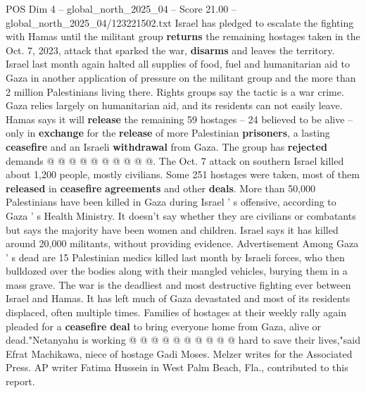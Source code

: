 \begin{textsample}{POS Dim 4 – global\_north\_2025\_04 – Score 21.00 – global\_north\_2025\_04/123221502.txt}
Israel has pledged to escalate the fighting with Hamas until the militant group \textbf{returns} the remaining hostages taken in the Oct. 7, 2023, attack that sparked the war, \textbf{disarms} and leaves the territory.
Israel last month again halted all supplies of food, fuel and humanitarian aid to Gaza in another application of pressure on the militant group and the more than 2 million Palestinians living there.
Rights groups say the tactic is a war crime.
Gaza relies largely on humanitarian aid, and its residents can not easily leave.
Hamas says it will \textbf{release} the remaining 59 hostages -- 24 believed to be alive -- only in \textbf{exchange} for the \textbf{release} of more Palestinian \textbf{prisoners}, a lasting \textbf{ceasefire} and an Israeli \textbf{withdrawal} from Gaza.
The group has \textbf{rejected} demands @ @ @ @ @ @ @ @ @ @.
The Oct. 7 attack on southern Israel killed about 1,200 people, mostly civilians.
Some 251 hostages were taken, most of them \textbf{released} in \textbf{ceasefire} \textbf{agreements} and other \textbf{deals}.
More than 50,000 Palestinians have been killed in Gaza during Israel ' s offensive, according to Gaza ' s Health Ministry.
It doesn't say whether they are civilians or combatants but says the majority have been women and children.
Israel says it has killed around 20,000 militants, without providing evidence.
Advertisement Among Gaza ' s dead are 15 Palestinian medics killed last month by Israeli forces, who then bulldozed over the bodies along with their mangled vehicles, burying them in a mass grave.
The war is the deadliest and most destructive fighting ever between Israel and Hamas.
It has left much of Gaza devastated and most of its residents displaced, often multiple times.
Families of hostages at their weekly rally again pleaded for a \textbf{ceasefire} \textbf{deal} to bring everyone home from Gaza, alive or dead."Netanyahu is working @ @ @ @ @ @ @ @ @ @ hard to save their lives,"said Efrat Machikawa, niece of hostage Gadi Moses.
Melzer writes for the Associated Press.
AP writer Fatima Hussein in West Palm Beach, Fla., contributed to this report.

\end{textsample}
